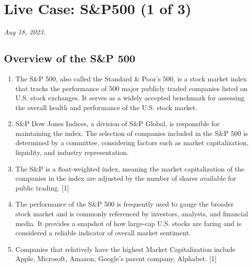 \documentclass[
  letterpaper,
  DIV=11,
  numbers=noendperiod]{scrreport}
\author{}
\date{}
\begin{document}
\ifdefined\Shaded\renewenvironment{Shaded}{\begin{tcolorbox}[breakable, frame hidden, boxrule=0pt, sharp corners, interior hidden, borderline west={3pt}{0pt}{shadecolor}, enhanced]}{\end{tcolorbox}}\fi

\hypertarget{live-case-sp500-1-of-3}{%
\chapter{Live Case: S\&P500 (1 of 3)}\label{live-case-sp500-1-of-3}}

\emph{Aug 18, 2023.}

\hypertarget{overview-of-the-sp-500}{%
\section{Overview of the S\&P 500}\label{overview-of-the-sp-500}}

\begin{enumerate}
\def\labelenumi{\arabic{enumi}.}
\item
  The S\&P 500, also called the Standard \& Poor's 500, is a stock
  market index that tracks the performance of 500 major publicly traded
  companies listed on U.S. stock exchanges. It serves as a widely
  accepted benchmark for assessing the overall health and performance of
  the U.S. stock market.
\item
  S\&P Dow Jones Indices, a division of S\&P Global, is responsible for
  maintaining the index. The selection of companies included in the S\&P
  500 is determined by a committee, considering factors such as market
  capitalization, liquidity, and industry representation.
\item
  The S\&P is a float-weighted index, meaning the market capitalization
  of the companies in the index are adjusted by the number of shares
  available for public trading. {[}1{]}
\item
  The performance of the S\&P 500 is frequently used to gauge the
  broader stock market and is commonly referenced by investors,
  analysts, and financial media. It provides a snapshot of how large-cap
  U.S. stocks are faring and is considered a reliable indicator of
  overall market sentiment.
\item
  Companies that relatively have the highest Market Capitalization
  include Apple, Microsoft, Amazon, Google's parent company, Alphabet.
  {[}1{]}
\end{enumerate}
\end{document}
